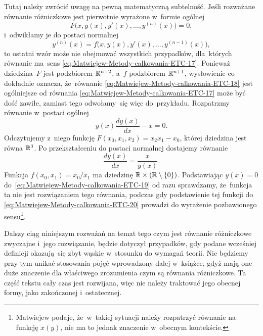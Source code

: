 \documentclass[a4paper,11pt]{article}
\numberwithin{equation}{section}
\begin{document}
Tutaj należy zwrócić uwagę na pewną matematyczną subtelność. Jeśli
rozważane równanie różniczkowe jest pierwotnie wyrażone w~formie ogólnej
\begin{equation}
  \label{eq:Czym-jest-rownanie-ETC-13}
  F\big( x, y( x ), y'( x ), \ldots, y^{ ( n ) }( x ) \big) = 0,
\end{equation}
i~odwikłamy je do postaci normalnej
\begin{equation}
  \label{eq:Czym-jest-rownanie-ETC-14}
  y^{ ( n ) }( x ) = f\big( x, y( x ), y'( x ), \ldots, y^{ ( n - 1 ) }( x ) \big),
\end{equation}
to ostatni wzór może nie obejmować wszystkich przypadków, dla~których
równanie ma~sens \eqref{eq:Matwiejew-Metody-calkowania-ETC-17}. Ponieważ
dziedzina~$F$ jest podzbiorem $\mathbb{R}^{ n + 2 }$, a~$f$ podzbiorem
$\mathbb{R}^{ n + 1 }$, wysłowienie co dokładnie oznacza, że~równanie
\eqref{eq:Matwiejew-Metody-calkowania-ETC-18}
jest ogólniejsze od równania \eqref{eq:Matwiejew-Metody-calkowania-ETC-17}
może być dość zawiłe, zamiast tego odwołamy~się więc do~przykładu.
Rozpatrzmy równanie w~postaci ogólnej
\begin{equation}
  \label{eq:Czym-jest-rownanie-ETC-15}
  y( x ) \frac{ d y( x ) }{ d x } - x = 0.
\end{equation}
Odczytujemy z~niego funkcję
$F( x_{ 0 }, x_{ 1 }, x_{ 2 } ) = x_{ 2 } x_{ 1 } - x_{ 0 }$, której dziedzina
jest równa $\mathbb{R}^{ 3 }$. Po przekształceniu do postaci normalnej dostajemy
równanie
\begin{equation}
  \label{eq:Czym-jest-rownanie-ETC-16}
  \frac{ d y( x ) }{ d x } = \frac{ x }{ y( x ) }.
\end{equation}
Funkcja $f( x_{ 0 }, x_{ 1 } ) = x_{ 0 } / x_{ 1 }$ ma dziedzinę
$\mathbb{R} \times ( \mathbb{R} \setminus \{ 0 \} )$. Podstawiając $y( x ) = 0$
do~\eqref{eq:Matwiejew-Metody-calkowania-ETC-19} od razu sprawdzamy,
że~funkcja ta nie jest rozwiązaniem tego równania, podczas gdy podstawienie
tej funkcji do \eqref{eq:Matwiejew-Metody-calkowania-ETC-20} prowadzi do
wyrażenie pozbawionego sensu\footnote{Matwiejew podaje, że~w~takiej
  sytuacji należy rozpatrzyć równanie na funkcję $x( y )$, nie ma to
  jednak znaczenie w~obecnym kontekście.}.

Dalszy ciąg niniejszym rozważań na temat tego czym jest równanie
różniczkowe zwyczajne i~jego rozwiązanie, będzie dotyczył przypadków, gdy
podane wcześniej definicji okazują~się zbyt wąskie w~stosunku do wymagań
teorii. Nie będziemy przy tym unikać stosowania pojęć wprowadzony dalej
w~książce, gdyż mają one duże znaczenie dla właściwego zrozumienia czym są
równania różniczkowe. Ta część tekstu cały czas jest rozwijana, więc nie
należy traktować jego obecnej formy, jako zakończonej i~ostatecznej.
\end{document}
